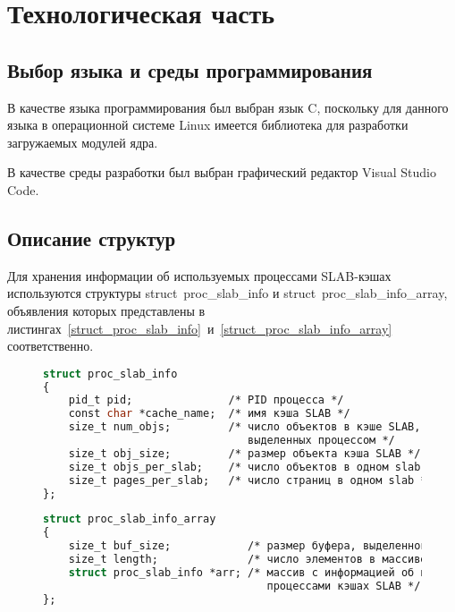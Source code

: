 \chapter{Технологическая часть}

\section{Выбор языка и среды программирования}

В качестве языка программирования был выбран язык C, поскольку для данного языка в операционной системе Linux имеется библиотека для разработки загружаемых модулей ядра.

В качестве среды разработки был выбран графический редактор Visual Studio Code.

\section{Описание структур}

Для хранения информации об используемых процессами SLAB-кэшах используются структуры struct~proc\_slab\_info и struct~proc\_slab\_info\_array, объявления которых представлены в листингах~\ref{struct_proc_slab_info}~и~\ref{struct_proc_slab_info_array} соответственно.
\begin{figure}[H]
	\begin{lstlisting}[label=struct_proc_slab_info,caption=Объявление структуры struct~proc\_slab\_info,language=Caml]
struct proc_slab_info
{
	pid_t pid;               /* PID процесса */
	const char *cache_name;  /* имя кэша SLAB */
	size_t num_objs;         /* число объектов в кэше SLAB, 
	                            выделенных процессом */
	size_t obj_size;         /* размер объекта кэша SLAB */
	size_t objs_per_slab;    /* число объектов в одном slab */
	size_t pages_per_slab;   /* число страниц в одном slab */
};
	\end{lstlisting}
\end{figure}
\begin{figure}[H]
	\begin{lstlisting}[label=struct_proc_slab_info_array,caption=Объявление структуры struct~proc\_slab\_info\_array,language=Caml]
struct proc_slab_info_array
{
	size_t buf_size;            /* размер буфера, выделенного под массив */
	size_t length;              /* число элементов в массиве */
	struct proc_slab_info *arr; /* массив с информацией об используемых
	                               процессами кэшах SLAB */
};
	\end{lstlisting}
\end{figure}


